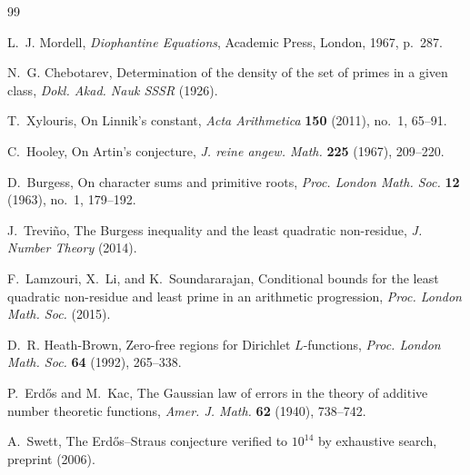 \documentclass[11pt,a4paper]{article}
\theoremstyle{plain}
\theoremstyle{plain}
\theoremstyle{definition}
\numberwithin{equation}{section}
\begin{document}
\begin{thebibliography}{99}

L.~J. Mordell, \emph{Diophantine Equations}, Academic Press, London, 1967, p.~287.

N.~G. Chebotarev, Determination of the density of the set of primes in a given class, \emph{Dokl. Akad. Nauk SSSR} (1926).

T.~Xylouris, On Linnik's constant, \emph{Acta Arithmetica} \textbf{150} (2011), no.~1, 65--91.

C.~Hooley, On Artin's conjecture, \emph{J. reine angew. Math.} \textbf{225} (1967), 209--220.

D.~Burgess, On character sums and primitive roots, \emph{Proc. London Math. Soc.} \textbf{12} (1963), no.~1, 179--192.

J.~Trevi\~no, The Burgess inequality and the least quadratic non-residue, \emph{J. Number Theory} (2014).

F.~Lamzouri, X.~Li, and K.~Soundararajan, Conditional bounds for the least quadratic non-residue and least prime in an arithmetic progression, \emph{Proc. London Math. Soc.} (2015).

D.~R. Heath-Brown, Zero-free regions for Dirichlet $L$-functions, \emph{Proc. London Math. Soc.} \textbf{64} (1992), 265--338.

P.~Erd\H{o}s and M.~Kac, The Gaussian law of errors in the theory of additive number theoretic functions, \emph{Amer. J. Math.} \textbf{62} (1940), 738--742.

A.~Swett, The Erd\H{o}s--Straus conjecture verified to $10^{14}$ by exhaustive search, preprint (2006).

\end{thebibliography}
\end{document}

